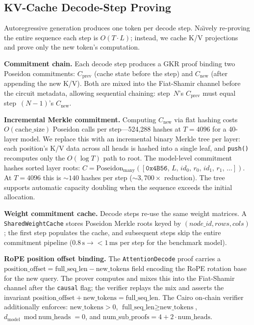 \documentclass[10pt,twocolumn]{article}
\theoremstyle{definition}
\theoremstyle{remark}
\begin{document}
\subsection{KV-Cache Decode-Step Proving}\label{sec:kv-decode}

Autoregressive generation produces one token per decode step.
Na\"{\i}vely re-proving the entire sequence each step is
$O(T \cdot L)$; instead, we cache K/V projections and prove
only the new token's computation.

\textbf{Commitment chain.}
Each decode step produces a GKR proof binding two Poseidon
commitments: $C_{\text{prev}}$ (cache state before the step)
and $C_{\text{new}}$ (after appending the new K/V).
Both are mixed into the Fiat-Shamir channel before the circuit
metadata, allowing sequential chaining:
step~$N$'s $C_{\text{prev}}$ must equal step~$(N\!-\!1)$'s
$C_{\text{new}}$.

\textbf{Incremental Merkle commitment.}
Computing $C_{\text{new}}$ via flat hashing costs
$O(\text{cache\_size})$ Poseidon calls per step---524{,}288
hashes at $T\!=\!4096$ for a 40-layer model.
We replace this with an incremental binary Merkle tree per layer:
each position's K/V data across all heads is hashed into a single
leaf, and \texttt{push()} recomputes only the $O(\log T)$ path to
root.
The model-level commitment hashes sorted layer roots:
$C = \text{Poseidon}_{\text{many}}([\texttt{0x4B56},\,
L,\, id_0,\, r_0,\, id_1,\, r_1,\, \ldots])$.
At $T\!=\!4096$ this is ${\sim}140$ hashes per step
(${\sim}3{,}700\times$ reduction).
The tree supports automatic capacity doubling when the
sequence exceeds the initial allocation.

\textbf{Weight commitment cache.}
Decode steps re-use the same weight matrices.
A \texttt{SharedWeightCache} stores Poseidon Merkle roots keyed
by $(node\_id, rows, cols)$; the first step populates the cache,
and subsequent steps skip the entire commitment pipeline
($0.8\,\text{s} \to {<}1\,\text{ms}$ per step for the
benchmark model).

\textbf{RoPE position offset binding.}
The \texttt{AttentionDecode} proof carries a
$\text{position\_offset} = \text{full\_seq\_len} - \text{new\_tokens}$
field encoding the RoPE rotation base for the new query.
The prover computes and mixes this into the Fiat-Shamir channel
after the \texttt{causal} flag; the verifier replays the mix and
asserts the invariant
$\text{position\_offset} + \text{new\_tokens} = \text{full\_seq\_len}$.
The Cairo on-chain verifier additionally enforces:
$\text{new\_tokens} > 0$,
$\text{full\_seq\_len} \geq \text{new\_tokens}$,
$d_{\text{model}} \bmod \text{num\_heads} = 0$,
and $\text{num\_sub\_proofs} = 4 + 2 \cdot \text{num\_heads}$.
\end{document}
